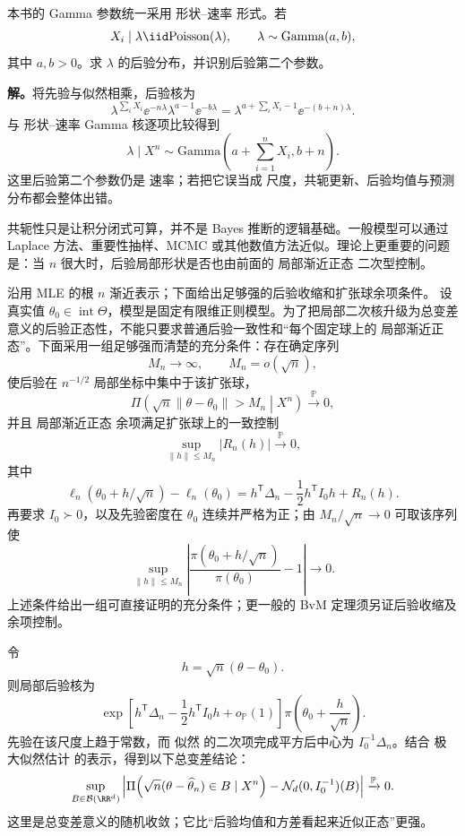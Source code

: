 \begin{workedexample}
本书的 Gamma 参数统一采用 形状--速率 形式。若
\[
 X_i\mid\lambda\iid\mathrm{Poisson}(\lambda),
 \qquad
 \lambda\sim\mathrm{Gamma}(a,b),
\]
其中 $a,b>0$。求 $\lambda$ 的后验分布，并识别后验第二个参数。

\textbf{解。}将先验与似然相乘，后验核为
\[
 \lambda^{\sum_iX_i}\ee^{-n\lambda}
 \lambda^{a-1}\ee^{-b\lambda}
 =\lambda^{a+\sum_iX_i-1}
 \ee^{-(b+n)\lambda}.
\]
与 形状--速率 Gamma 核逐项比较得到
\[
 \lambda\mid X^n
 \sim\mathrm{Gamma}\!\left(a+\sum_{i=1}^nX_i,b+n\right).
\]
这里后验第二个参数仍是 速率；若把它误当成 尺度，共轭更新、后验均值与预测分布都会整体出错。
\end{workedexample}

共轭性只是让积分闭式可算，并不是 Bayes 推断的逻辑基础。一般模型可以通过 Laplace 方法、重要性抽样、MCMC 或其他数值方法近似。理论上更重要的问题是：当 $n$ 很大时，后验局部形状是否也由前面的 局部渐近正态 二次型控制。

\begin{theorem}
沿用 MLE 的根 $n$ 渐近表示；下面给出足够强的后验收缩和扩张球余项条件。
设真实值 $\theta_0\in\operatorname{int}\Theta$，模型是固定有限维正则模型。为了把局部二次核升级为总变差意义的后验正态性，不能只要求普通后验一致性和“每个固定球上的 局部渐近正态”。下面采用一组足够强而清楚的充分条件：存在确定序列
\[
 M_n\to\infty,
 \qquad
 M_n=o(\sqrt n),
\]
使后验在 $n^{-1/2}$ 局部坐标中集中于该扩张球，
\begin{equation*}\Pi\!\left(
 \sqrt n\|\theta-\theta_0\|>M_n
 \middle|X^n
 \right)\xrightarrow{\mathbb P}0,
\end{equation*}
并且 局部渐近正态 余项满足扩张球上的一致控制
\[
 \sup_{\|h\|\le M_n}|R_n(h)|\xrightarrow{\mathbb P}0,
\]
其中
\[
 \ell_n(\theta_0+h/\sqrt n)-\ell_n(\theta_0)
 =h^{\mathsf T}\Delta_n-
 \frac12h^{\mathsf T}I_0h+R_n(h).
\]
再要求 $I_0\succ0$，以及先验密度在 $\theta_0$ 连续并严格为正；由 $M_n/\sqrt n\to0$ 可取该序列使
\[
 \sup_{\|h\|\le M_n}
 \left|
 \frac{\pi(\theta_0+h/\sqrt n)}{\pi(\theta_0)}-1
 \right|\to0.
\]
上述条件给出一组可直接证明的充分条件；更一般的 BvM 定理须另证后验收缩及余项控制。

令
\[
 h=\sqrt n(\theta-\theta_0).
\]
则局部后验核为
\[
 \exp\!\left[
 h^{\mathsf T}\Delta_n
 -\frac12h^{\mathsf T}I_0h
 +o_{\mathbb P}(1)
 \right]
 \pi\!\left(\theta_0+\frac h{\sqrt n}\right).
\]
先验在该尺度上趋于常数，而 似然 的二次项完成平方后中心为 $I_0^{-1}\Delta_n$。结合 极大似然估计 的表示，得到以下总变差结论：
\begin{equation}\label{eq:math-stat-bvm-local}
 \sup_{B\in\mathcal B(\RR^d)}
 \left|
 \Pi\!\left(
 \sqrt n(\theta-\widehat\theta_n)\in B
 \mid X^n
 \right)
 -\mathcal N_d(0,I_0^{-1})(B)
 \right|
 \xrightarrow{\mathbb P}0.
\end{equation}
这里是总变差意义的随机收敛；它比“后验均值和方差看起来近似正态”更强。
\end{theorem}


